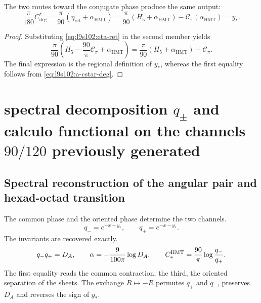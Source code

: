 \begin{theorem}
\label{thm:l9s102:conmutatividad-cstar}
The two routes toward the conjugate phase produce the same output:
\begin{equation}
 \boxed{
 \frac\pi{180}C^*_{\deg}
 =\frac\pi{90}(\eta_{\mathrm{ret}}+\alpha_{\mathrm{HMT}})
 =\frac\pi{90}(H_5+\alpha_{\mathrm{HMT}})
 -\mathscr C_\pi(\alpha_{\mathrm{HMT}})=y_*.}
 \label{eq:l9s102:cuadrado-cstar}
\end{equation}
\end{theorem}

\begin{proof}
Substituting \cref{eq:l9s102:eta-ret} in the second member yields
\[
 \frac\pi{90}
 \left(H_5-\frac{90}{\pi}\mathscr C_\pi+\alpha_{\mathrm{HMT}}\right)
 =\frac\pi{90}(H_5+\alpha_{\mathrm{HMT}})-\mathscr C_\pi.
\]
The final expression is the regional definition of \(y_*\), whereas the
first equality follows from \cref{eq:l9s102:a-cstar-deg}.
\end{proof}

\section{spectral decomposition \texorpdfstring{\(q_\pm\)}{q+/-} and calculo functional on the channels \texorpdfstring{\(90/120\)}{90/120} previously generated}
\label{sec:s102:c38:6}

\subsection{Spectral reconstruction of the angular pair and hexad-octad transition}
\label{sec:s102:c38:6:1}


The common phase and the oriented phase determine the two channels.
\[
q_-=e^{-x+y_*},
\qquad
q_+=e^{-x-y_*}.
\]
The invariants are recovered exactly.
\[
q_-q_+=D_A,
\qquad
\alpha=-\frac9{100\pi}\log D_A,
\qquad
C_*^{\rm HMT}=\frac{90}{\pi}\log\frac{q_-}{q_+}.
\]
The first equality reads the common contraction; the third, the oriented
separation of the sheets. The exchange \(R\mapsto-R\) permutes
\(q_+\) and \(q_-\), preserves \(D_A\) and reverses the sign of \(y_*\).

